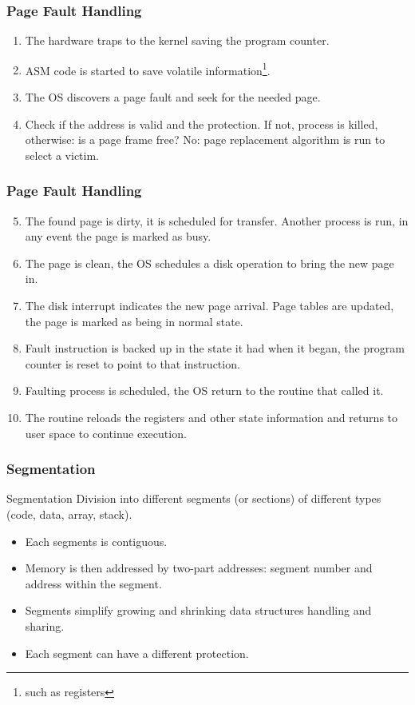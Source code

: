   \begin{frame}
    \frametitle{Page Fault Handling}
    \begin{enumerate}
      \item The hardware traps to the kernel saving the program counter.
      \item ASM code is started to save volatile information\footnote{such as registers}.
      \item The OS discovers a page fault and seek for the needed page.
      \item Check if the address is valid and the protection. If not, process is killed, otherwise: is a page frame free? No: page replacement algorithm is run to select a victim.
    \end{enumerate}
  \end{frame}

  \begin{frame}
    \frametitle{Page Fault Handling}
    \begin{enumerate}\setcounter{enumi}{4}
      \item The found page is dirty, it is scheduled for transfer. Another process is run, in any event the page is marked as busy.
      \item The page is clean, the OS schedules a disk operation to bring the new page in.
      \item The disk interrupt indicates the new page arrival. Page tables are updated, the page is marked as being in normal state.
      \item Fault instruction is backed up in the state it had when it began, the program counter is reset to point to that instruction.
      \item Faulting process is scheduled, the OS return to the routine that called it.
      \item The routine reloads the registers and other state information and returns to user space to continue execution.
    \end{enumerate}
  \end{frame}

  \begin{frame}
    \frametitle{Segmentation}
    \begin{block}{Segmentation}
      Division into different segments (or sections) of different types (code, data, array, stack).
      \begin{itemize}
        \item Each segments is contiguous.
        \item Memory is then addressed by two-part addresses: segment number and address within the segment.
        \item Segments simplify growing and shrinking data structures handling and sharing.
        \item Each segment can have a different protection.
      \end{itemize}

    \end{block}
  \end{frame}

